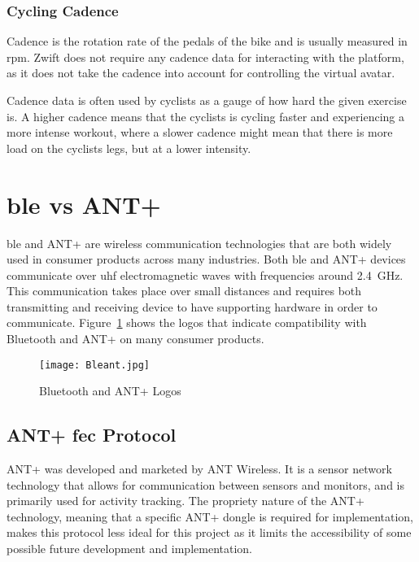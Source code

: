\subsubsection{Cycling Cadence}
Cadence is the rotation rate of the pedals of the bike and is usually measured in \ac{rpm}. Zwift does not require any cadence data for interacting with the platform, as it does not take the cadence into account for controlling the virtual avatar. 

Cadence data is often used by cyclists as a gauge of how hard the given exercise is. A higher cadence means that the cyclists is cycling faster and experiencing a more intense workout, where a slower cadence might mean that there is more load on the cyclists legs, but at a lower intensity. \citep[2022]{Zwift:2022}

\section{\acf{ble} vs ANT+}
\label{sec:ant}

\ac{ble} and ANT+ are wireless communication technologies that are both widely used in consumer products across many industries. Both \ac{ble} and ANT+ devices communicate over \ac{uhf} electromagnetic waves with frequencies around \SI{2.4}{\giga\hertz}. This communication takes place over small distances and requires both transmitting and receiving device to have supporting hardware in order to communicate. Figure~\ref{fig:bleant} shows the logos that indicate compatibility with Bluetooth and ANT+ on many consumer products. \citep{Bromley:2022}

\begin{figure}[H]
	\begin{center}
		\texttt{[image: Bleant.jpg]}
		\caption{Bluetooth and ANT+ Logos}
		\label{fig:bleant}
		\citep[2022]{yamaha:2022}
	\end{center}
\end{figure}

\subsection{ANT+ \acl{fec} Protocol}

ANT+ was developed and marketed by ANT Wireless. It is a sensor network technology that allows for communication between sensors and monitors, and is primarily used for activity tracking. The propriety nature of the ANT+ technology, meaning that a specific ANT+ dongle is required for implementation, makes this protocol less ideal for this project as it limits the accessibility of some possible future development and implementation. \citep{Bromley:2022}

